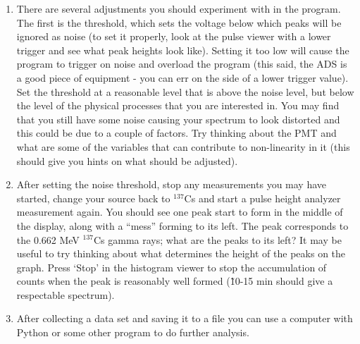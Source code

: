 \documentclass{../lab}
\begin{document}
\begin{enumerate}
\begin{enumerate}
        \item There are several adjustments you should experiment with in the program. The first is the threshold, which sets the voltage below which peaks will be ignored as noise (to set it properly, look at the pulse viewer with a lower trigger and see what peak heights look like). Setting it too low will cause the program to trigger on noise and overload the program (this said, the ADS is a good piece of equipment - you can err on the side of a lower trigger value). %
        Set the threshold at a reasonable level that is above the noise level, but below the level of the physical processes that you are interested in. You may find that you still have some noise causing your spectrum to look distorted and this could be due to a couple of factors. Try thinking about the PMT and what are some of the variables that can contribute to non-linearity in it (this should give you hints on what should be adjusted).

        \item After setting the noise threshold, stop any measurements you may have started, change your source back to $^{137}$Cs and start a pulse height analyzer measurement again. You should see one peak start to form in the middle of the display, along with a ``mess'' forming to its left. The peak corresponds to the 0.662 MeV $^{137}$Cs gamma rays; what are the peaks to its left? It may be useful to try thinking about what determines the height of the peaks on the graph. Press `Stop' in the histogram viewer to stop the accumulation of counts when the peak is reasonably well formed (\~ 10-15 min should give a respectable spectrum). %

        \item After collecting a data set and saving it to a file you can use a computer with Python or some other program to do further analysis.

    \end{enumerate}


\end{enumerate}
\end{document}
